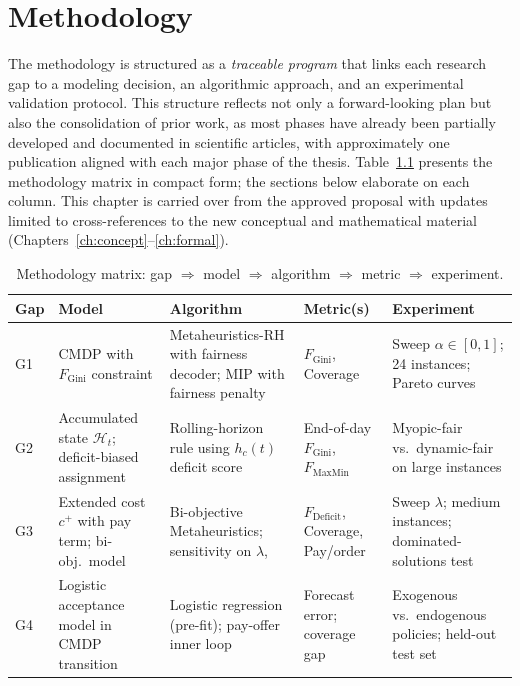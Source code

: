 \documentclass[12pt,a4paper]{report}
\begin{document}
\chapter{Methodology}
\label{ch:methodology}
\label{sec:methodology}

The methodology is structured as a \emph{traceable program} that links each research gap to a modeling decision, an algorithmic approach, and an experimental validation protocol. This structure reflects not only a forward-looking plan but also the consolidation of prior work, as most phases have already been partially developed and documented in scientific articles, with approximately one publication aligned with each major phase of the thesis. Table~\ref{tab:method_matrix} presents the methodology matrix in compact form; the sections below elaborate on each column. This chapter is carried over from the approved proposal with updates limited to cross-references to the new conceptual and mathematical material (Chapters~\ref{ch:concept}--\ref{ch:formal}).


\begin{table}[ht]
\centering
\caption{Methodology matrix: gap $\Rightarrow$ model $\Rightarrow$ algorithm $\Rightarrow$
metric $\Rightarrow$ experiment.}
\label{tab:method_matrix}
\small
\begin{tabularx}{\textwidth}{p{1.0cm}p{2.8cm}p{2.8cm}p{2.2cm}p{3.2cm}}
\toprule
\textbf{Gap} & \textbf{Model} & \textbf{Algorithm} & \textbf{Metric(s)} & \textbf{Experiment} \\
\midrule
G1 &
  CMDP with $F_\text{Gini}$ constraint &
  Metaheuristics-RH with fairness decoder; MIP with fairness penalty & $F_\text{Gini}$, Coverage &
  Sweep $\alpha \in [0,1]$; 24 instances; Pareto curves \\
\midrule
G2 &
  Accumulated state $\mathcal{H}_t$; deficit-biased assignment &
  Rolling-horizon rule using $h_c(t)$ deficit score &
  End-of-day $F_\text{Gini}$, $F_\text{MaxMin}$ &
  Myopic-fair vs.\ dynamic-fair on large instances \\
\midrule
G3 &
  Extended cost $c^+$ with pay term; bi-obj.\ model &
  Bi-objective Metaheuristics; sensitivity on $\lambda$,  &
  $F_\text{Deficit}$, Coverage, Pay/order &
  Sweep $\lambda$; medium instances; dominated-solutions test \\
\midrule
G4 &
  Logistic acceptance model in CMDP transition &
  Logistic regression (pre-fit); pay-offer inner loop &
  Forecast error; coverage gap &
  Exogenous vs.\ endogenous policies; held-out test set \\
\bottomrule
\end{tabularx}
\end{table}
\end{document}
